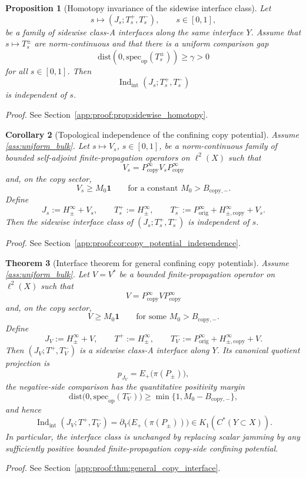 \documentclass[11pt]{article}
\numberwithin{equation}{section}
\newtheorem{theorem}{Theorem}[section]
\newtheorem{proposition}[theorem]{Proposition}
\newtheorem{corollary}[theorem]{Corollary}
\theoremstyle{definition}
\theoremstyle{remark}
\newcommand{\proofref}[1]{%
  \par\noindent\emph{Proof.} See Section~\ref{#1}.\par\medskip
}
\newcommand{\proofappendixref}[1]{\proofref{#1}}
\newcommand{\Id}{\mathbf{1}}
\newcommand{\spec}{\mathrm{spec}}
\newcommand{\dist}{\mathrm{dist}}
\newcommand{\Indint}{\operatorname{Ind}_{\mathrm{int}}}
\begin{document}
\begin{proposition}[Homotopy invariance of the sidewise interface class]\label{prop:sidewise_homotopy}
Let
\[
s\longmapsto (J_s;T_s^+,T_s^-),
\qquad s\in[0,1],
\]
be a family of sidewise class-A interfaces along the same interface $Y$. Assume that
$s\mapsto T_s^\pm$ are norm-continuous and that there is a uniform comparison gap
\[
\dist(0,\spec_{\mathrm{op}}(T_s^\pm))\ge \gamma>0
\]
for all $s\in[0,1]$. Then
\[
\Indint(J_s;T_s^+,T_s^-)
\]
is independent of $s$.
\end{proposition}
\proofappendixref{app:proof:prop:sidewise_homotopy}




\begin{corollary}[Topological independence of the confining copy potential]\label{cor:copy_potential_independence}
Assume \ref{ass:uniform_bulk}. Let $s\mapsto V_s$, $s\in[0,1]$, be a norm-continuous family of bounded self-adjoint
finite-propagation operators on $\ell^2(X)$ such that
\[
V_s=P_{\mathrm{copy}}^\infty V_sP_{\mathrm{copy}}^\infty
\]
and, on the copy sector,
\[
V_s\ge M_0\Id
\qquad\text{for a constant }M_0>B_{\mathrm{copy},-}.
\]
Define
\[
J_s:=H_\pm^\infty+V_s,
\qquad
T_s^+:=H_\pm^\infty,
\qquad
T_s^-:=P_{\mathrm{orig}}^\infty+H_{\pm,\mathrm{copy}}^\infty+V_s.
\]
Then the sidewise interface class of $(J_s;T_s^+,T_s^-)$ is independent of $s$.
\end{corollary}
\proofappendixref{app:proof:cor:copy_potential_independence}




\begin{theorem}[Interface theorem for general confining copy potentials]\label{thm:general_copy_interface}
Assume \ref{ass:uniform_bulk}. Let $V=V^*$ be a bounded finite-propagation operator on $\ell^2(X)$
such that
\[
V=P_{\mathrm{copy}}^\infty V P_{\mathrm{copy}}^\infty
\]
and, on the copy sector,
\[
V\ge M_0\Id
\qquad\text{for some }M_0>B_{\mathrm{copy},-}.
\]
Define
\[
J_V:=H_\pm^\infty+V,
\qquad
T^+:=H_\pm^\infty,
\qquad
T_V^-:=P_{\mathrm{orig}}^\infty+H_{\pm,\mathrm{copy}}^\infty+V.
\]
Then $(J_V;T^+,T_V^-)$ is a sidewise class-A interface along $Y$. Its canonical quotient
projection is
\[
p_{J_V}=E_+\!\bigl(\pi(P_\pm)\bigr),
\]
the negative-side comparison has the quantitative positivity margin
\[
\dist\bigl(0,\spec_{\mathrm{op}}(T_V^-)\bigr)\ge \min\{1,M_0-B_{\mathrm{copy},-}\},
\]
and hence
\[
\Indint(J_V;T^+,T_V^-)
=
\partial_Y\!\bigl(E_+(\pi(P_\pm))\bigr)
\in K_1(C^*(Y\subset X)).
\]
In particular, the interface class is unchanged by replacing scalar jamming by any sufficiently
positive bounded finite-propagation copy-side confining potential.
\end{theorem}
\proofappendixref{app:proof:thm:general_copy_interface}
\end{document}
